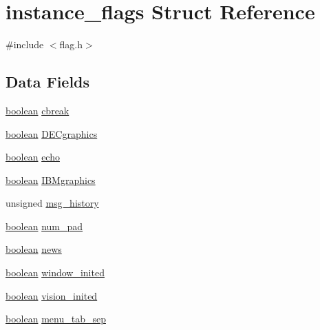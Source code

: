 \hypertarget{structinstance__flags}{\section{instance\+\_\+flags Struct Reference}
\label{structinstance__flags}
}


{\ttfamily \#include $<$flag.\+h$>$}

\subsection*{Data Fields}
\begin{DoxyCompactItemize}
\item 
\hyperlink{global_8h_a531b10dd351aa162d7dcccd1966308b8}{boolean} \hyperlink{structinstance__flags_acc12d1d0c33d63aee349eac10eec35a5}{cbreak}
\item 
\hyperlink{global_8h_a531b10dd351aa162d7dcccd1966308b8}{boolean} \hyperlink{structinstance__flags_ab2cddd19049fbf0fa4be5255bddfd633}{D\+E\+Cgraphics}
\item 
\hyperlink{global_8h_a531b10dd351aa162d7dcccd1966308b8}{boolean} \hyperlink{structinstance__flags_a4a064908e2a505018c11319cc53d7fe1}{echo}
\item 
\hyperlink{global_8h_a531b10dd351aa162d7dcccd1966308b8}{boolean} \hyperlink{structinstance__flags_a50993380c2db8f82946efa771d779154}{I\+B\+Mgraphics}
\item 
unsigned \hyperlink{structinstance__flags_adbf4e331046e9ace346e832fc8a59074}{msg\+\_\+history}
\item 
\hyperlink{global_8h_a531b10dd351aa162d7dcccd1966308b8}{boolean} \hyperlink{structinstance__flags_abf8ead01634763341598a10bd5052f7e}{num\+\_\+pad}
\item 
\hyperlink{global_8h_a531b10dd351aa162d7dcccd1966308b8}{boolean} \hyperlink{structinstance__flags_a65a361ffd2534ddff433ba62f3dfb579}{news}
\item 
\hyperlink{global_8h_a531b10dd351aa162d7dcccd1966308b8}{boolean} \hyperlink{structinstance__flags_a2fc6c78c4c5f6e1d0027ac575135426f}{window\+\_\+inited}
\item 
\hyperlink{global_8h_a531b10dd351aa162d7dcccd1966308b8}{boolean} \hyperlink{structinstance__flags_a61d68e3b4f194bab370620301c0cb7d9}{vision\+\_\+inited}
\item 
\hyperlink{global_8h_a531b10dd351aa162d7dcccd1966308b8}{boolean} \hyperlink{structinstance__flags_a85c9a72818b89578114f16b9f26a95c0}{menu\+\_\+tab\+\_\+sep}
\item 

\end{DoxyCompactItemize}
